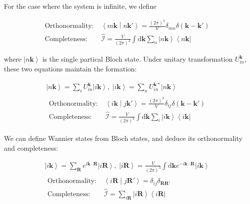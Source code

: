 \documentclass{report}
\begin{document}
For the case where the system is infinite, we define

\begin{equation}
  \begin{aligned}
    \text{Orthonormality:} \;&
    \left\langle m\boldsymbol{k} \middle| n\boldsymbol{k}' \right\rangle 
      = \frac{(2\pi)^3}{V} \delta_{mn} \delta(\boldsymbol{k}-\boldsymbol{k}') \\
    \text{Completeness:} \;&
    \hat{\mathcal{I}} = \frac{V}{(2\pi)^3} \int \mathrm{d}\boldsymbol{k} 
      \sum_{n} \left| n\boldsymbol{k} \right\rangle \left\langle n\boldsymbol{k} \right| 
  \end{aligned}
\end{equation}

\noindent
where $\left| n\boldsymbol{k} \right\rangle$ is the single partical Bloch state.
Under unitary transformation $U_{in}^{\boldsymbol{k}}$, these two equations maintain the formation:

\begin{equation}
  \begin{gathered}
    \left| n \boldsymbol{k} \right\rangle 
      = \sum_{i} U_{in}^{\boldsymbol{k}} \left| i\boldsymbol{k} \right\rangle ,\;
    \left| i\boldsymbol{k} \right\rangle = \sum_{n} U_{in}^{\boldsymbol{k}*} \left| n \boldsymbol{k} \right\rangle \\
    \begin{aligned}
      \text{Orthonormality:} \;&
        \left\langle i\boldsymbol{k} \middle| j\boldsymbol{k}' \right\rangle = \frac{(2\pi)^3}{V} \delta_{ij} \delta(\boldsymbol{k}-\boldsymbol{k}') \\
      \text{Completeness:} \;&
        \hat{\mathcal{I}} = \frac{V}{(2\pi)^3} \int \mathrm{d}\boldsymbol{k} \sum_{i} \left| i\boldsymbol{k} \right\rangle \left\langle i\boldsymbol{k} \right| 
    \end{aligned}
  \end{gathered}
\end{equation}

\noindent
We can define Wannier states from Bloch states, and deduce its orthonormality and completeness:

\begin{equation}
  \begin{gathered}
    \left| i\boldsymbol{k} \right\rangle 
      = \sum_{\boldsymbol{R}} e^{i\boldsymbol{k} \cdot \boldsymbol{R}} \left| i\boldsymbol{R} \right\rangle ,\;
    \left| i\boldsymbol{R} \right\rangle 
      = \frac{V}{(2\pi)^3} \int \mathrm{d}\boldsymbol{k} e^{-i\boldsymbol{k} \cdot \boldsymbol{R}} 
        \left| i\boldsymbol{k} \right\rangle \\
    \begin{aligned}
      \text{Orthonormality:} \;&
        \left\langle i\boldsymbol{R} \middle| j\boldsymbol{R}' \right\rangle = \delta_{ij} \delta_{\boldsymbol{R}\boldsymbol{R}'} \\
      \text{Completeness:} \;&
        \hat{\mathcal{I}} = \sum_{i\boldsymbol{R}} \left| i\boldsymbol{R} \right\rangle \left\langle i\boldsymbol{R} \right| 
    \end{aligned}
  \end{gathered}
\end{equation}
\end{document}
